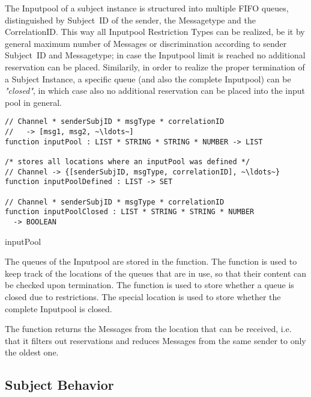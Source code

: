 The Inputpool of a subject instance is structured into multiple FIFO queues, distinguished by Subject~ID of the sender, the Messagetype and the CorrelationID. This way all Inputpool Restriction Types can be realized, be it by general maximum number of Messages or discrimination according to sender Subject~ID and Messagetype; in case the Inputpool limit is reached no additional reservation can be placed. Similarily, in order to realize the proper termination of a Subject Instance, a specific queue (and also the complete Inputpool) can be \textit{"closed"}, in which case also no additional reservation can be placed into the input pool in general.

\begin{listing}[htbp]
\begin{verbatim}
// Channel * senderSubjID * msgType * correlationID
//   -> [msg1, msg2, ~\ldots~]
function inputPool : LIST * STRING * STRING * NUMBER -> LIST

/* stores all locations where an inputPool was defined */
// Channel -> {[senderSubjID, msgType, correlationID], ~\ldots~}
function inputPoolDefined : LIST -> SET

// Channel * senderSubjID * msgType * correlationID
function inputPoolClosed : LIST * STRING * STRING * NUMBER
  -> BOOLEAN
\end{verbatim}
\caption{inputPool}
\label{lst:shortasm:inputPool}
\end{listing}

The queues of the Inputpool are stored in the  function. The function  is used to keep track of the locations of the queues that are in use, so that their content can be checked upon termination. The function  is used to store whether a queue is closed due to restrictions. The special location  is used to store whether the complete Inputpool is closed.

The function  returns the Messages from the location  that can be received, i.e. that it filters out reservations and reduces Messages from the same sender to only the oldest one.

\subsection{Subject Behavior}

